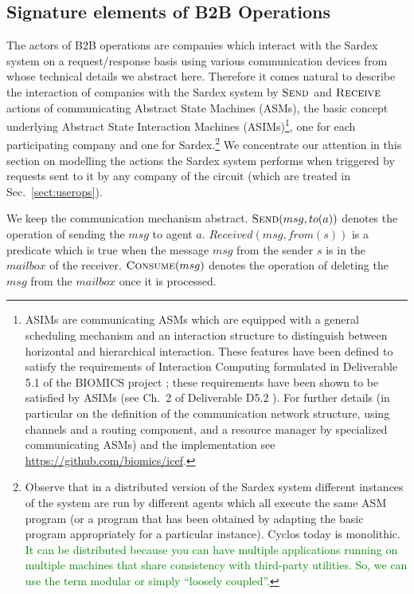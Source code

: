 \subsection{Signature elements of B2B Operations}
\label{signaturepaymtop}
The actors of B2B operations are companies which interact with the Sardex system on a request/response basis using various 
communication devices from whose technical details we abstract here. Therefore it comes natural to describe the interaction of companies with the Sardex system by $\hbox{\sc Send}$ and $\hbox{\sc Receive}$ actions of communicating Abstract State Machines (ASMs), the basic concept underlying Abstract State Interaction Machines (ASIMs)\footnote{ASIMs are communicating ASMs which are equipped with a general scheduling mechanism and an interaction structure to distinguish
between horizontal and hierarchical interaction. These features have
been defined to satisfy the requirements of Interaction Computing
formulated in Deliverable 5.1 of the BIOMICS project  \cite{BIOMICSD51}; these requirements have been shown to be satisfied by ASIMs (see Ch.\ 2 of
Deliverable D5.2 \cite{BIOMICSD52}). For further details (in particular on the
definition of the communication network structure, using channels and
a routing component, and a resource manager by specialized
communicating ASMs) and the implementation see
\url{https://github.com/biomics/icef}.}, one for each participating company and one for Sardex.\footnote{Observe that in a distributed version of the Sardex system different instances of the system are run by different agents which all execute the same ASM program (or a program that has been obtained by adapting the basic program appropriately for a particular instance). Cyclos today is monolithic. \textcolor{green}{It can be distributed because you can have multiple applications running on multiple machines that share consistency with third-party utilities. So, we can use the term modular or simply  ``loosely coupled''.}} We concentrate our attention in this section on modelling the actions the Sardex system performs when triggered by requests sent to it by any company of the circuit (which are treated in Sec.~\ref{sect:userops}).

We keep the communication mechanism abstract. $\hbox{\sc Send}(msg,to(a))$ denotes the operation of sending the $msg$ to agent $a$. 
$Received(msg,from(s))$ is a predicate which is true when the message $msg$ from the sender $s$ is in the $mailbox$ of the receiver. $\hbox{\sc Consume}(msg)$ denotes the operation of deleting the $msg$ from the $mailbox$ once it is processed. 


